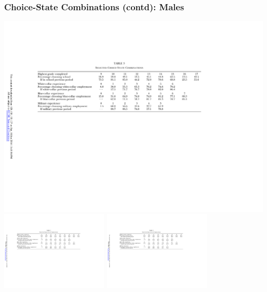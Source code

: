 \begin{frame}
	\frametitle{Choice-State Combinations (contd): Males}
	\includegraphics{tab-figs/table3_1997_header} \\
	\includegraphics[height=1.5in]{tab-figs/table3_1997_left} \includegraphics[height=1.5in]{tab-figs/table3b_1997}
\end{frame}

